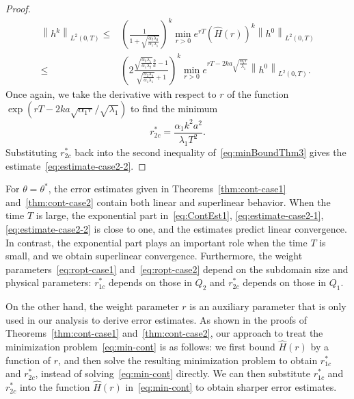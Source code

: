 \documentclass[reqno]{amsart}
\newcommand{\norm}[1]{\left\lVert#1\right\rVert}
\begin{document}
\begin{proof}
\begin{equation}\label{eq:minBoundThm3}
\begin{aligned}
\norm{h^k}_{L^2(0, T)} \leq& \left(\frac{1}{1+\sqrt{\frac{\alpha_2\lambda_2}{\alpha_1\lambda_1}}}\right)^k\min_{r>0}e^{rT} \left(\hat H(r)\right)^k \norm{h^0}_{L^2(0, T)}
\\
\leq& \left(2\frac{\sqrt{\frac{\alpha_2 \lambda_1}{\alpha_1\lambda_2}}\frac{b}{a} - 1}{\sqrt{\frac{\alpha_2 \lambda_2}{\alpha_1\lambda_1}}+1}  \right)^k \min_{r>0}e^{rT - 2ka\sqrt{\frac{\alpha_1r}{\lambda_1}}}\norm{h^0}_{L^2(0, T)}.
\end{aligned}
\end{equation}
Once again, we take the derivative with respect to $r$ of the function $\exp(rT - 2ka\sqrt{\alpha_1r}/\sqrt{\lambda_1})$ to find the minimum 
\begin{equation}\label{eq:ropt-case2}
r^*_{2c} = \frac{\alpha_1 k^2a^2}{\lambda_1 T^2}.
\end{equation}
Substituting $r^*_{2c}$ back into the second inequality of~\eqref{eq:minBoundThm3} gives the estimate~\eqref{eq:estimate-case2-2}.
\end{proof}


For $\theta = \theta^*$, the error estimates given in Theorems~\ref{thm:cont-case1} and~\ref{thm:cont-case2} contain both linear and superlinear behavior. When the time $T$ is large, the exponential part in~\eqref{eq:ContEst1}, \eqref{eq:estimate-case2-1}, \eqref{eq:estimate-case2-2} is close to one, and the estimates predict linear convergence. In contrast, the exponential part plays an important role when the time $T$ is small, and we obtain superlinear convergence. 
Furthermore, the weight parameters~\eqref{eq:ropt-case1} and~\eqref{eq:ropt-case2} depend on the subdomain size and physical parameters: $r^*_{1c}$ depends on those in $Q_2$ and $r^*_{2c}$ depends on those in $Q_1$. 


On the other hand, the weight parameter $r$ is an auxiliary parameter that is only used in our analysis to derive error estimates. As shown in the proofs of Theorems~\ref{thm:cont-case1} and~\ref{thm:cont-case2}, our approach to treat the minimization problem~\eqref{eq:min-cont} is as follows: we first bound $\hat H(r)$ by a function of $r$, and then solve the resulting minimization problem to obtain $r^*_{1c}$ and $r^*_{2c}$, instead of solving~\eqref{eq:min-cont} directly. We can then substitute $r^*_{1c}$ and $r^*_{2c}$ into the function $\hat H(r)$ in~\eqref{eq:min-cont} to obtain sharper error estimates.
\end{document}

